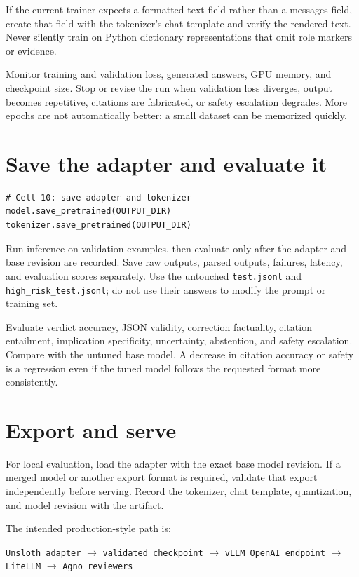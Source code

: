 \documentclass[11pt,oneside]{book}
\begin{document}
If the current trainer expects a formatted text field rather than a messages field, create that field with the tokenizer's chat template and verify the rendered text. Never silently train on Python dictionary representations that omit role markers or evidence.

Monitor training and validation loss, generated answers, GPU memory, and checkpoint size. Stop or revise the run when validation loss diverges, output becomes repetitive, citations are fabricated, or safety escalation degrades. More epochs are not automatically better; a small dataset can be memorized quickly.

\section{Save the adapter and evaluate it}

\begin{verbatim}
# Cell 10: save adapter and tokenizer
model.save_pretrained(OUTPUT_DIR)
tokenizer.save_pretrained(OUTPUT_DIR)
\end{verbatim}

Run inference on validation examples, then evaluate only after the adapter and base revision are recorded. Save raw outputs, parsed outputs, failures, latency, and evaluation scores separately. Use the untouched \texttt{test.jsonl} and \texttt{high\_risk\_test.jsonl}; do not use their answers to modify the prompt or training set.

Evaluate verdict accuracy, JSON validity, correction factuality, citation entailment, implication specificity, uncertainty, abstention, and safety escalation. Compare with the untuned base model. A decrease in citation accuracy or safety is a regression even if the tuned model follows the requested format more consistently.

\section{Export and serve}

For local evaluation, load the adapter with the exact base model revision. If a merged model or another export format is required, validate that export independently before serving. Record the tokenizer, chat template, quantization, and model revision with the artifact.

The intended production-style path is:

\begin{center}
\texttt{Unsloth adapter} $\rightarrow$ \texttt{validated checkpoint} $\rightarrow$ \texttt{vLLM OpenAI endpoint} $\rightarrow$ \texttt{LiteLLM} $\rightarrow$ \texttt{Agno reviewers}
\end{center}
\end{document}
